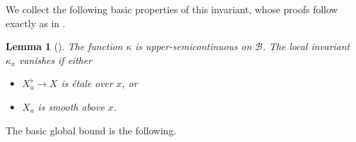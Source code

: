 \documentclass[openany]{amsbook}
\newtheorem{lemma}[theorem]{Lemma}
\theoremstyle{definition}
\theoremstyle{remark}
\numberwithin{equation}{section}
\newcommand{\cB}{\mathcal{B}}
\renewcommand{\-}{\operatorname{-}}
\begin{document}
We collect the following basic properties of this invariant, whose proofs follow exactly as in \cite[\S 9.7]{CLII}.

\begin{lemma}[{\cite[Remarques 9.7.2, Proposition 9.7.4]{CLII}}]\label{lem.kappa.vanishing}
    The function $\kappa$ is upper-semicontinuous on $\cB$. The local invariant $\kappa_x$ vanishes if either
    \begin{itemize}
        \item $X_a^\flat \to X$ is \'etale over $x$, or
        \item $X_a$ is smooth above $x$. 
    \end{itemize}
\end{lemma}

The basic global bound is the following.
\end{document}
